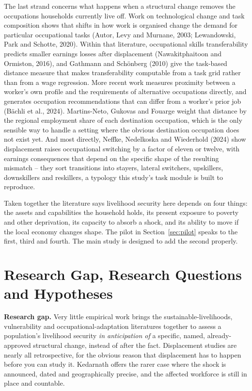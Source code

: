 \documentclass[11pt]{article}
\begin{document}
The last strand concerns what happens when a structural change removes the occupations
households currently live off. Work on technological change and task composition shows that
shifts in how work is organised change the demand for particular occupational tasks (Autor,
Levy and Murnane, 2003; Lewandowski, Park and Schotte, 2020). Within that literature,
occupational skills transferability predicts smaller earnings losses after displacement
(Nawakitphaitoon and Ormiston, 2016), and Gathmann and Schönberg (2010) give the task-based
distance measure that makes transferability computable from a task grid rather than from a
wage regression. More recent work measures proximity between a worker's own profile and the
requirements of alternative occupations directly, and generates occupation recommendations
that can differ from a worker's prior job (Bächli et al., 2024). Martins-Neto, Gukovas and
Fouarge weight that distance by the regional employment share of each destination occupation,
which is the only sensible way to handle a setting where the obvious destination occupation
does not exist yet. And most directly, Neffke, Nedelkoska and Wiederhold (2024) show
displacement raises occupational switching by a factor of eleven or twelve, with earnings
consequences that depend on the specific shape of the resulting mismatch -- they sort
transitions into stayers, lateral switchers, upskillers, downskillers and reskillers, a
typology this study's task module is built to reproduce.

Taken together the literature says livelihood security here depends on four things: the
assets and capabilities the household holds, its present exposure to poverty and other
deprivation, its capacity to absorb a shock, and its ability to move if the local economy
changes shape. The pilot in Section~\ref{sec:pilot} speaks to the first, third and fourth.
The main study is designed to add the second properly.

\section{Research Gap, Research Questions and Hypotheses}

\textbf{Research gap.} Very little empirical work brings the sustainable-livelihoods,
vulnerability and occupational-adaptation literatures together to assess a population's
livelihood security \emph{in anticipation of} a specific, named, already-approved structural
change, instead of after the fact. Displacement studies are nearly all retrospective, for the
obvious reason that displacement has to happen before you can study it. Kedarnath offers the
rarer case where the shock is announced, dated and geographically precise, and the affected
workforce is still in place and countable.
\end{document}
